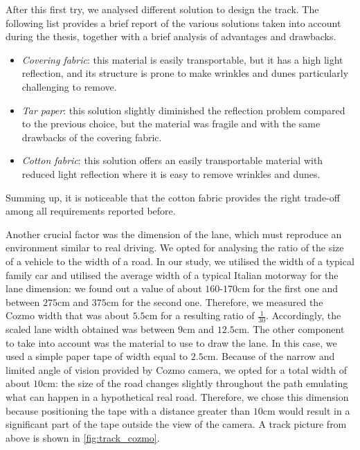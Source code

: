 After this first try, we analysed different solution to design the track.
The following list provides a brief report of the various solutions taken into account during the thesis, together with a brief analysis of advantages and drawbacks.

\begin{itemize}
    \item \textit{Covering fabric}: this material is easily transportable, but it has a high light reflection, and its structure is prone to make wrinkles and dunes particularly challenging to remove.
    \item \textit{Tar paper}: this solution slightly diminished the reflection problem compared to the previous choice, but the material was fragile and with the same drawbacks of the covering fabric.
    \item \textit{Cotton fabric}: this solution offers an easily transportable material with reduced light reflection where it is easy to remove wrinkles and dunes.
\end{itemize}

Summing up, it is noticeable that the cotton fabric provides the right trade-off among all requirements reported before.

Another crucial factor was the dimension of the lane, which must reproduce an environment similar to real driving.
We opted for analysing the ratio of the size of a vehicle to the width of a road.
In our study, we utilised the width of a typical family car and utilised the average width of a typical Italian motorway for the lane dimension: we found out a value of about $160$-$170$cm for the first one and between $275$cm and $375$cm for the second one.
Therefore, we measured the Cozmo width that was about $5.5$cm for a resulting ratio of $\frac{1}{30}$.
Accordingly, the scaled lane width obtained was between $9$cm and $12.5$cm.
The other component to take into account was the material to use to draw the lane. In this case, we used a simple paper tape of width equal to $2.5$cm. Because of the narrow and limited angle of vision provided by Cozmo camera, we opted for a total width of about $10$cm: the size of the road changes slightly throughout the path emulating what can happen in a hypothetical real road. Therefore, we chose this dimension because positioning the tape with a distance greater than $10$cm would result in a significant part of the tape outside the view of the camera.
A track picture from above is shown in \vref{fig:track_cozmo}.